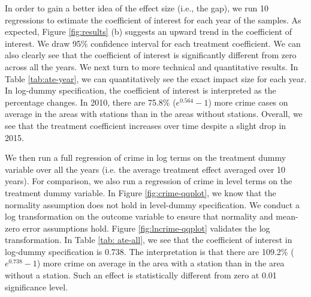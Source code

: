 \documentclass[a4paper, 11pt]{article}
\begin{document}
In order to gain a better idea of the effect size (i.e., the gap), we run 10 regressions to estimate the coefficient of interest for each year of the samples. As expected, Figure \ref{fig:results} (b) suggests an upward trend in the coefficient of interest. We draw 95\% confidence interval for each treatment coefficient. We can also clearly see that the coefficient of interest is significantly different from zero across all the years. We next turn to more technical and quantitative results. In Table \ref{tab:ate-year}, we can quantitatively see the exact impact size for each year. In log-dummy specification, the coefficient of interest is interpreted as the percentage changes. In 2010, there are 75.8\% ($e^{0.564}-1$) more crime cases on average in the areas with stations than in the areas without stations. Overall, we see that the treatment coefficient increases over time despite a slight drop in 2015.

We then run a full regression of crime in log terms on the treatment dummy variable over all the years (i.e. the average treatment effect averaged over 10 years). For comparison, we also run a regression of crime in level terms on the treatment dummy variable. In Figure \ref{fig:crime-qqplot}, we know that the normality assumption does not hold in level-dummy specification. We conduct a log transformation on the outcome variable to ensure that normality and mean-zero error assumptions hold. Figure \ref{fig:lncrime-qqplot} validates the log transformation. In Table \ref{tab: ate-all}, we see that the coefficient of interest in log-dummy specification is 0.738. The interpretation is that there are 109.2\% ($e^{0.738}-1$) more crime on average in the area with a station than in the area without a station. Such an effect is statistically different from zero at 0.01 significance level.

\end{document}
